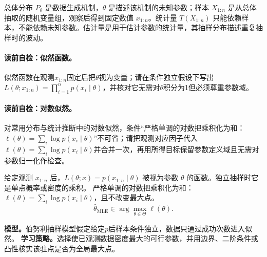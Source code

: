 总体分布 $P_\theta$ 是数据生成机制，$\theta$ 是描述该机制的未知参数；样本 $X_{1:n}$ 是从总体抽取的随机变量组，观察后得到固定数值 $x_{1:n}$。统计量 $T(X_{1:n})$ 只能依赖样本，不能依赖未知参数。估计量是用于估计参数的统计量，其抽样分布描述重复抽样时的波动。


\paragraph{读前自检：似然函数。}似然函数在观测$x_{1:n}$固定后把$\theta$视为变量；请在条件独立假设下写出$L(\theta;x_{1:n})=\prod_{i=1}^n p(x_i\mid\theta)$，并核对它无需对$\theta$积分为1但必须尊重参数域。\par
\paragraph{读前自检：对数似然。}对常用分布与统计推断中的对数似然，条件“严格单调的对数把乘积化为和：$\ell(\theta)=\sum_i\log p(x_i\mid\theta)$”不可省；请把观测对应因子代入$\ell(\theta)=\sum_i\log p(x_i\mid\theta)$并合并一次，再用所得目标保留参数定义域且无需对参数归一化作检查。\par

给定观测 $x_{1:n}$ 后，$L(\theta;x)=p(x_{1:n}\mid\theta)$ 被视为参数 $\theta$ 的函数。独立抽样时它是单点概率或密度的乘积。
严格单调的对数把乘积化为和：$\ell(\theta)=\sum_i\log p(x_i\mid\theta)$，且不改变最大点。
\[
\hat\theta_{\mathrm{MLE}}\in\arg\max_{\theta\in\Theta}\ell(\theta).
\]

\label{struct:V1-C05-CH08}
\textbf{模型。}伯努利抽样模型假定给定$p$后样本条件独立，数据只通过成功次数进入似然。
\label{struct:V1-C05-CH09}
\textbf{学习策略。}选择使已观测数据密度最大的可行参数，并用边界、二阶条件或凸性核实该驻点是否为全局最大点。

\label{struct:V1-C05-CH11}


